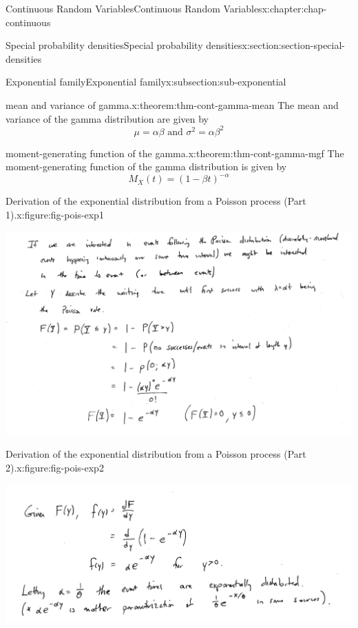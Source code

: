 \documentclass[oneside,10pt,]{book}
\begin{document}
\begin{chapterptx}{Continuous Random Variables}{}{Continuous Random Variables}{}{}{x:chapter:chap-continuous}
\begin{sectionptx}{Special probability densities}{}{Special probability densities}{}{}{x:section:section-special-densities}
\begin{subsectionptx}{Exponential family}{}{Exponential family}{}{}{x:subsection:sub-exponential}
\begin{theorem}{mean and variance of gamma.}{}{x:theorem:thm-cont-gamma-mean}%
The mean and variance of the gamma distribution are given by%
\begin{equation*}
\mu = \alpha\beta\text{ and }\sigma^2 = \alpha\beta^2
\end{equation*}
%
\end{theorem}
\begin{theorem}{moment-generating function of the gamma.}{}{x:theorem:thm-cont-gamma-mgf}%
The moment-generating function of the gamma distribution is given by%
\begin{equation*}
M_X(t) = (1-\beta t)^{-\alpha}
\end{equation*}
%
\end{theorem}
\begin{figureptx}{Derivation of the exponential distribution from a Poisson process (Part 1).}{x:figure:fig-pois-exp1}{}%
\begin{image}{0.1}{0.8}{0.1}%
\includegraphics[width=\linewidth]{./images/poisson_exp.png}
\end{image}%
\tcblower
\end{figureptx}%
\begin{figureptx}{Derivation of the exponential distribution from a Poisson process (Part 2).}{x:figure:fig-pois-exp2}{}%
\begin{image}{0.1}{0.8}{0.1}%
\includegraphics[width=\linewidth]{./images/poisson_exp2.png}

\end{image}
\end{figureptx}
\end{subsectionptx}
\end{sectionptx}
\end{chapterptx}
\end{document}
